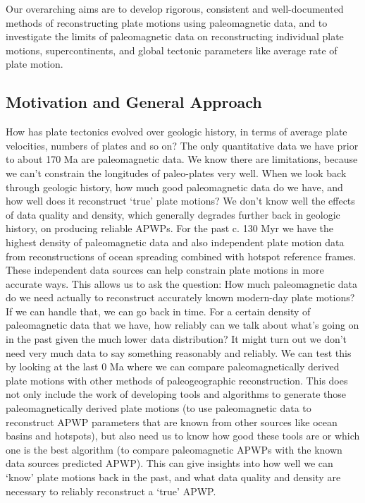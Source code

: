 Our overarching aims are to develop rigorous, consistent and well-documented
methods of reconstructing plate motions using paleomagnetic data, and to
investigate the limits of paleomagnetic data on reconstructing individual plate
motions, supercontinents, and global tectonic parameters like average rate of
plate motion.

\subsection{Motivation and General Approach}

How has plate tectonics evolved over geologic history, in terms of average plate
velocities, numbers of plates and so on? The only quantitative data we have
prior to about 170 Ma are paleomagnetic data. We know there are limitations,
because we can't constrain the longitudes of paleo-plates very well. When we
look back through geologic history, how much good paleomagnetic data do we have,
and how well does it reconstruct `true' plate motions? We don't know well the
effects of data quality and density, which generally degrades further back in
geologic history, on producing reliable APWPs. For the past c. 130
Myr we have the highest density of paleomagnetic data and also independent plate
motion data from reconstructions of ocean spreading combined with hotspot
reference frames. These independent data sources can help constrain plate
motions in more accurate ways. This allows us to ask the question: How much
paleomagnetic data do we need actually to reconstruct accurately known
modern-day plate motions? If we can handle that, we can go back in time. For a
certain density of paleomagnetic data that we have, how reliably can we talk
about what's going on in the past given the much lower data distribution? It
might turn out we don't need very much data to say something reasonably and
reliably. We can test this by looking at the last 0 Ma where we
can compare paleomagnetically derived plate motions with other methods of
paleogeographic reconstruction. This does not only include the work of
developing tools and algorithms to generate those paleomagnetically derived
plate motions (to use paleomagnetic data to reconstruct APWP parameters that are
known from other sources like ocean basins and hotspots), but also need us to
know how good these tools are or which one is the best algorithm (to compare
paleomagnetic APWPs with the known data sources predicted APWP). This can give
insights into how well we can `know' plate motions back in the past, and what
data quality and density are necessary to reliably reconstruct a `true' APWP\@.

